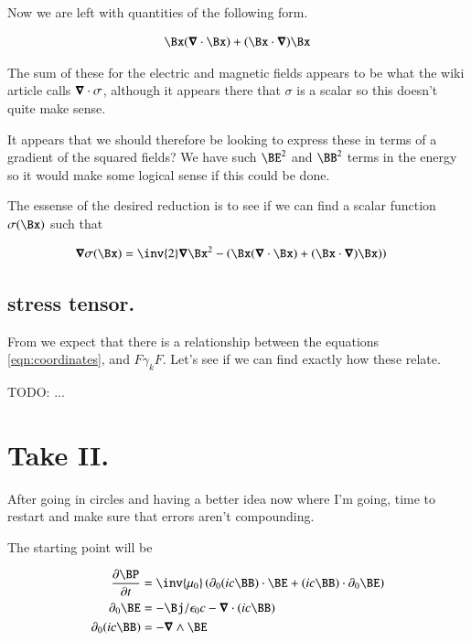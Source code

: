 \documentclass{article}
\begin{document}
Now we are left with quantities of the following form.

\begin{align*}
\Bx (\spacegrad \cdot \Bx) +(\Bx \cdot \spacegrad) \Bx 
\end{align*}

The sum of these for the electric and magnetic fields appears to be what the 
wiki article calls $\boldsymbol{\nabla} \cdot \sigma$, although it appears
there that $\sigma$ is a scalar so this doesn't quite make sense.

It appears that 
we should therefore be looking to
express these in terms of a gradient of the squared fields?  We have such $\BE^2$ and $\BB^2$ terms in the energy so it would make some logical sense if this
could be done.

The essense of the desired reduction is to see if we can find a scalar function $\sigma(\Bx)$ such that

\begin{align*}
\spacegrad \sigma(\Bx) &= \inv{2} \spacegrad \Bx^2 - \left(\Bx (\spacegrad \cdot \Bx) + (\Bx \cdot \spacegrad) \Bx )\right)
\end{align*}

\subsection{ stress tensor. }

From \cite{doran2003gap} we expect that there is a relationship between
the equations \ref{eqn:coordinates}, and $F \gamma_k F$.  Let's see 
if we can find exactly how these relate.



TODO: ...

\section{ Take II. }

After going in circles and having a better idea now where I'm going, time to restart and make sure that errors aren't compounding.

The starting point will be

\begin{align*}
\PD{t}{\BP} &= \inv{\mu_0} \left( \partial_0 (i c\BB) \cdot \BE  + (i c\BB) \cdot \partial_0 \BE  \right) \\
\partial_0 \BE &= - \Bj/\epsilon_0 c - \spacegrad \cdot (ic \BB) \\
\partial_0 (i c \BB) &= -\spacegrad \wedge \BE
\end{align*}
\end{document}
